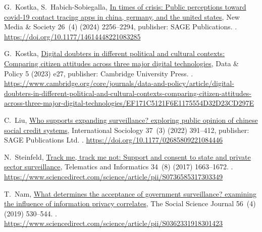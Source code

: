 \documentclass[
  number]{elsarticle}
\begin{document}
\begin{thebibliography}{10}
G.~Kostka, S.~Habich-Sobiegalla, \href{https://doi.org/10.1177/14614448221083285}{In times of crisis: Public perceptions toward covid-19 contact tracing apps in china, germany, and the united states}, New Media \& Society 26~(4) (2024) 2256--2294, publisher: SAGE Publications.
\newblock \href {https://doi.org/10.1177/14614448221083285} {}.
\newline\urlprefix\url{https://doi.org/10.1177/14614448221083285}

G.~Kostka, \href{https://www.cambridge.org/core/journals/data-and-policy/article/digital-doubters-in-different-political-and-cultural-contexts-comparing-citizen-attitudes-across-three-major-digital-technologies/EF171C5121F6E1175554D32D23CD297E}{Digital doubters in different political and cultural contexts: Comparing citizen attitudes across three major digital technologies}, Data \& Policy 5 (2023) e27, publisher: Cambridge University Press.
\newblock \href {https://doi.org/10.1017/dap.2023.25} {}.
\newline\urlprefix\url{https://www.cambridge.org/core/journals/data-and-policy/article/digital-doubters-in-different-political-and-cultural-contexts-comparing-citizen-attitudes-across-three-major-digital-technologies/EF171C5121F6E1175554D32D23CD297E}

C.~Liu, \href{https://doi.org/10.1177/02685809221084446}{Who supports expanding surveillance? exploring public opinion of chinese social credit systems}, International Sociology 37~(3) (2022) 391--412, publisher: SAGE Publications Ltd.
\newblock \href {https://doi.org/10.1177/02685809221084446} {}.
\newline\urlprefix\url{https://doi.org/10.1177/02685809221084446}

N.~Steinfeld, \href{https://www.sciencedirect.com/science/article/pii/S0736585317303349}{Track me, track me not: Support and consent to state and private sector surveillance}, Telematics and Informatics 34~(8) (2017) 1663--1672.
\newblock \href {https://doi.org/10.1016/j.tele.2017.07.012} {}.
\newline\urlprefix\url{https://www.sciencedirect.com/science/article/pii/S0736585317303349}

T.~Nam, \href{https://www.sciencedirect.com/science/article/pii/S0362331918301423}{What determines the acceptance of government surveillance? examining the influence of information privacy correlates}, The Social Science Journal 56~(4) (2019) 530--544.
\newblock \href {https://doi.org/10.1016/j.soscij.2018.10.001} {}.
\newline\urlprefix\url{https://www.sciencedirect.com/science/article/pii/S0362331918301423}


\end{thebibliography}
\end{document}
